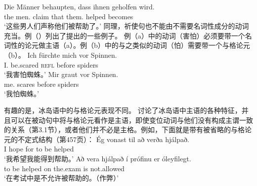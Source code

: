 \ea
\gll Die Männer behaupten, dass ihnen geholfen wird.\\
	 the men.\nom{} claim that them.\dat{} helped becomes\\
\glt `这些男人们声称他们被帮助了。'
\z
%
同理，祈使句也不能由不需要名词性成分的动词充当。例（）列出了\citet[]{Reis82}提出的一些例子。
\eal
{}
\zl
例（a）中的动词（害怕）必须要带一个名词性的论元做主语（a）。例（b）中的与之类似的动词（怕）需要带一个与格论元（b）。
\eal
\ex
\gll Ich fürchte mich vor Spinnen.\\
	 I.\nom{} be.scared \textsc{refl} before spiders\\
\glt `我害怕蜘蛛。'
\ex 
\gll Mir graut vor Spinnen.\\
	 me.\dat{} scares before spiders\\
\glt `我怕蜘蛛。'
\zl

\noindent
有趣的是，冰岛语中的与格论元表现不同。 \citet{ZMT85a} 讨论了冰岛语中主语的各种特征，并且可以在被动句中将与格论元看作是主语，即使变位动词与他们没有构成主谓一致的关系（第3.1节），或者他们并不必是主格。例如，下面就是带有被省略的与格论元的不定式结构（第457页）：
\eal
\ex 
\gll Ég vonast til að verða hjálpað.\\
     I hope for to be helped\\
\glt `我希望我能得到帮助。'
\ex
\gll Að vera hjálpað í prófinu er óleyfilegt.\\
     to be helped on the.exam is not.allowed\\
\glt `在考试中是不允许被帮助的。（作弊）'
\zl

